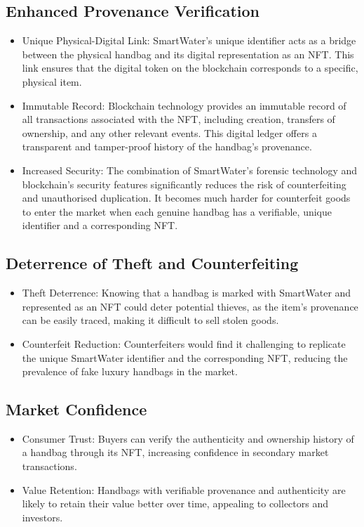 \documentclass{tufte-handout}
\begin{document}
\subsection{Enhanced Provenance Verification}\label{sec:page-layout}
\begin{itemize}
    \item Unique Physical-Digital Link: SmartWater's unique identifier acts as a bridge between the physical handbag and its digital representation as an NFT.
    This link ensures that the digital token on the blockchain corresponds to a specific, physical item.
    \item Immutable Record: Blockchain technology provides an immutable record of all transactions associated with the NFT, including creation, transfers of
    ownership, and any other relevant events. This digital ledger offers a transparent and tamper-proof history of the handbag's provenance.
    \item Increased Security: The combination of SmartWater's forensic technology and blockchain's security features significantly reduces the risk of
    counterfeiting and unauthorised duplication. It becomes much harder for counterfeit goods to enter the market when each genuine handbag has a verifiable,
    unique identifier and a corresponding NFT.
\end{itemize}
\subsection{Deterrence of Theft and Counterfeiting}\label{sec:page-layout}
\begin{itemize}
    \item Theft Deterrence: Knowing that a handbag is marked with SmartWater and represented as an NFT could deter potential thieves, as the item's provenance
    can be easily traced, making it difficult to sell stolen goods.
    \item Counterfeit Reduction: Counterfeiters would find it challenging to replicate the unique SmartWater identifier and the corresponding NFT, reducing
    the prevalence of fake luxury handbags in the market.
\end{itemize}
\subsection{Market Confidence}\label{sec:page-layout}
\begin{itemize}
    \item Consumer Trust: Buyers can verify the authenticity and ownership history of a handbag through its NFT, increasing confidence in secondary market
    transactions.
    \item Value Retention: Handbags with verifiable provenance and authenticity are likely to retain their value better over time, appealing to collectors
    and investors.  
\end{itemize}
\end{document}

